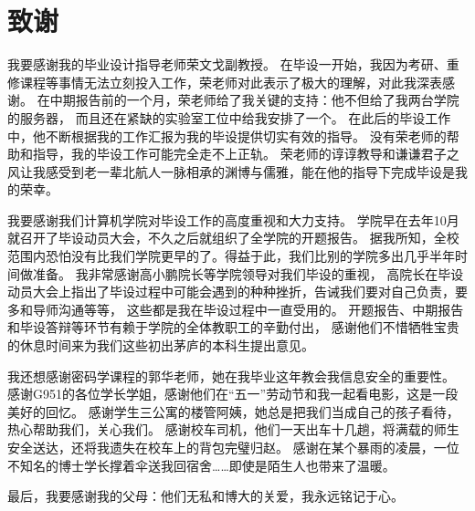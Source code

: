 \chapter*{致谢}
我要感谢我的毕业设计指导老师荣文戈副教授。
在毕设一开始，我因为考研、重修课程等事情无法立刻投入工作，荣老师对此表示了极大的理解，对此我深表感谢。
在中期报告前的一个月，荣老师给了我关键的支持：他不但给了我两台学院的服务器，
而且还在紧缺的实验室工位中给我安排了一个。
在此后的毕设工作中，他不断根据我的工作汇报为我的毕设提供切实有效的指导。
没有荣老师的帮助和指导，我的毕设工作可能完全走不上正轨。
荣老师的谆谆教导和谦谦君子之风让我感受到老一辈北航人一脉相承的渊博与儒雅，能在他的指导下完成毕设是我的荣幸。

我要感谢我们计算机学院对毕设工作的高度重视和大力支持。
学院早在去年10月就召开了毕设动员大会，不久之后就组织了全学院的开题报告。
据我所知，全校范围内恐怕没有比我们学院更早的了。得益于此，我们比别的学院多出几乎半年时间做准备。
我非常感谢高小鹏院长等学院领导对我们毕设的重视，
高院长在毕设动员大会上指出了毕设过程中可能会遇到的种种挫折，告诫我们要对自己负责，要多和导师沟通等等，
这些都是我在毕设过程中一直受用的。
开题报告、中期报告和毕设答辩等环节有赖于学院的全体教职工的辛勤付出，
感谢他们不惜牺牲宝贵的休息时间来为我们这些初出茅庐的本科生提出意见。

我还想感谢密码学课程的郭华老师，她在我毕业这年教会我信息安全的重要性。
感谢G951的各位学长学姐，感谢他们在“五一”劳动节和我一起看电影，这是一段美好的回忆。
感谢学生三公寓的楼管阿姨，她总是把我们当成自己的孩子看待，热心帮助我们，关心我们。
感谢校车司机，他们一天出车十几趟，将满载的师生安全送达，还将我遗失在校车上的背包完璧归赵。
感谢在某个暴雨的凌晨，一位不知名的博士学长撑着伞送我回宿舍……即使是陌生人也带来了温暖。

最后，我要感谢我的父母：他们无私和博大的关爱，我永远铭记于心。
